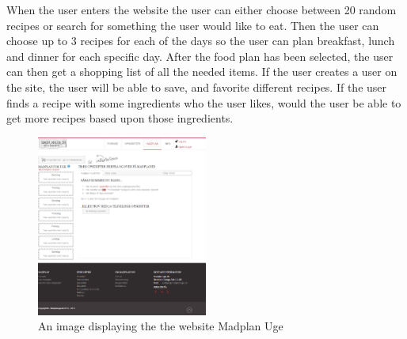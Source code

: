 When the user enters the website the user can either choose between 20 random recipes or search for something the user would like to eat.
Then the user can choose up to 3 recipes for each of the days so the user can plan breakfast, lunch and dinner for each specific day.
After the food plan has been selected, the user can then get a shopping list of all the needed items.
If the user creates a user on the site, the user will be able to save, and favorite different recipes.
If the user finds a recipe with some ingredients who the user likes, would the user be able to get more recipes based upon those ingredients.

\begin{figure}[H]
    \centering
    \includegraphics[width=0.5\textwidth]{Grafik/madplanuge}
    \caption{An image displaying the the website Madplan Uge}
    \label{MadPlanUge}
\end{figure}

